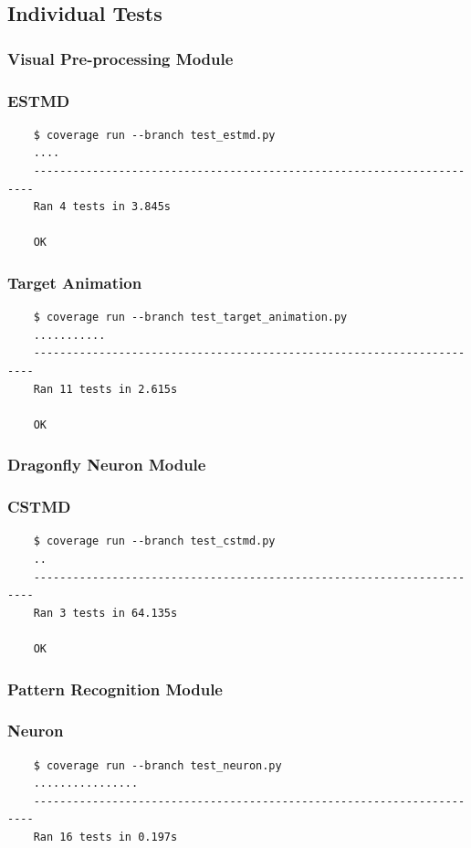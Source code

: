 \documentclass[a4paper,11pt]{article}
\begin{document}
\begin{appendices}
\subsection{Individual Tests}
\subsubsection{Visual Pre-processing Module}
\subsubsection*{{\hspace{6mm}}ESTMD}
\begin{verbatim}
    $ coverage run --branch test_estmd.py
    ....
    ----------------------------------------------------------------------
    Ran 4 tests in 3.845s

    OK
\end{verbatim}
\subsubsection*{{\hspace{6mm}}Target Animation}
\begin{verbatim}
    $ coverage run --branch test_target_animation.py
    ...........
    ----------------------------------------------------------------------
    Ran 11 tests in 2.615s

    OK
\end{verbatim}

\subsubsection{Dragonfly Neuron Module}
\subsubsection*{{\hspace{6mm}}CSTMD}
\begin{verbatim}
    $ coverage run --branch test_cstmd.py
    ..
    ----------------------------------------------------------------------
    Ran 3 tests in 64.135s

    OK
\end{verbatim}

\subsubsection{Pattern Recognition Module}
\subsubsection*{{\hspace{6mm}}Neuron}
\begin{verbatim}
    $ coverage run --branch test_neuron.py
    ................
    ----------------------------------------------------------------------
    Ran 16 tests in 0.197s


\end{verbatim}
\end{appendices}
\end{document}
